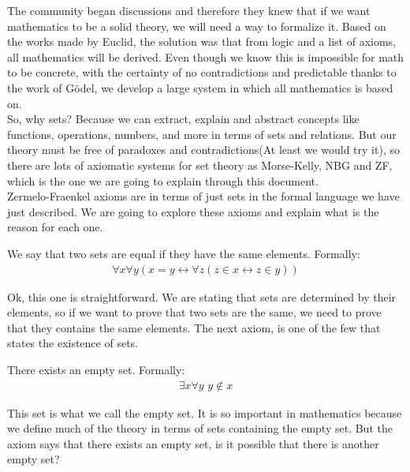 \documentclass{tufte-handout}
\begin{document}
The community began discussions and therefore they knew that if we want mathematics to be a solid theory, we will need a way to formalize it. Based on the works made by Euclid, the solution was that from logic and a list of axioms, all mathematics will be derived. Even though we know this is impossible for math to be concrete, with the certainty of no contradictions and predictable thanks to the work of Gödel, we develop a large system in which all mathematics is based on.\\

So, why sets? Because we can extract, explain and abstract concepts like functions, operations, numbers, and more in terms of sets and relations. But our theory must be free of paradoxes and contradictions(At least we would try it), so there are lots of axiomatic systems for set theory as Morse-Kelly, NBG and ZF, which is the one we are going to explain through this document.\\

Zermelo-Fraenkel axioms are in terms of just sets in the formal language we have just described. We are going to explore these axioms and explain what is the reason for each one.

\begin{axiom}
	We say that two sets are equal if they have the same elements. Formally:
	\begin{align*}
		\forall x \forall y(x = y \leftrightarrow \forall z(z \in x \leftrightarrow z \in y))
	\end{align*}
\end{axiom}

Ok, this one is straightforward. We are stating that sets are determined by their elements, so if we want to prove that two sets are the same, we need to prove that they contains the same elements. The next axiom, is one of the few that states the existence of sets.

\begin{axiom}
	There exists an empty set. Formally:
	\begin{align*}
		\exists x \forall y \,\, y \not\in x
	\end{align*}
\end{axiom}

This set is what we call the empty set. It is so important in mathematics because we define much of the theory in terms of sets containing the empty set. But the axiom says that there exists an empty set, is it possible that there is another empty set?
\end{document}
